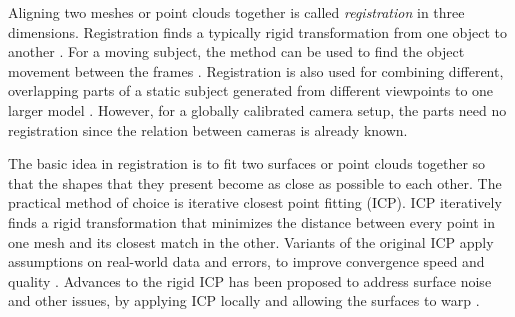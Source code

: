 Aligning two meshes or point clouds together is called \emph{registration} in three dimensions.
Registration finds a typically rigid transformation from one object to another \cite{zhang1994iterative,rusinkiewicz2001efficient}.
For a moving subject, the method can be used to find the object movement between the frames \cite{pons2005modelling,zhao2005alignment}.
Registration is also used for combining different, overlapping parts of a static subject generated from different viewpoints to one larger model \cite{eggert1998simultaneous,huber2003fully}.
However, for a globally calibrated camera setup, the parts need no registration since the relation between cameras is already known.

The basic idea in registration is to fit two surfaces or point clouds together so that the shapes that they present become as close as possible to each other.
The practical method of choice is iterative closest point fitting (ICP).
ICP iteratively finds a rigid transformation that minimizes the distance between every point in one mesh and its closest match in the other.
Variants of the original ICP apply assumptions on real-world data and errors, to improve convergence speed and quality \cite{zhang1994iterative,rusinkiewicz2001efficient}.
Advances to the rigid ICP has been proposed to address surface noise and other issues, by applying ICP locally and allowing the surfaces to warp \cite{brown2007global}.


